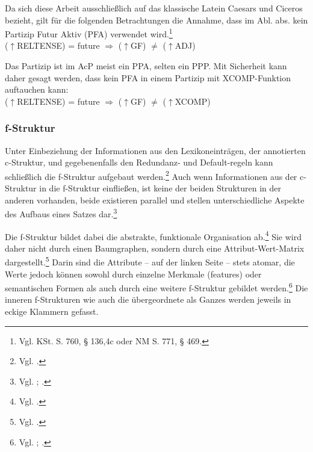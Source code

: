 \documentclass[12pt,a4paper]{article}
\begin{document}


Da sich diese Arbeit ausschließlich auf das klassische Latein Caesars und Ciceros bezieht, gilt für die folgenden Betrachtungen die Annahme, dass im Abl. abs. kein Partizip Futur Aktiv (PFA) verwendet wird.\footnote{Vgl. KSt. S. 760, § 136,4c oder NM S. 771, § 469.}\\
($\uparrow$RELTENSE) = future $\Rightarrow$ ($\uparrow$GF) $\neq$ ($\uparrow$ADJ)

Das Partizip ist im AcP meist ein PPA, selten ein PPP. Mit Sicherheit kann daher gesagt werden, dass kein PFA in einem Partizip mit XCOMP-Funktion auftauchen kann: \\
($\uparrow$RELTENSE) = future $\Rightarrow$ ($\uparrow$GF) $\neq$ ($\uparrow$XCOMP)




\subsubsection{f-Struktur}
Unter Einbeziehung der Informationen aus den Lexikoneinträgen, der annotierten c-Struktur, und gegebenenfalls den Redundanz- und Default-regeln kann schließlich die f-Struktur aufgebaut werden.\footnote{Vgl. \cite[13; 23]{Rohrer}.} Auch wenn Informationen aus der c-Struktur in die f-Struktur einfließen, ist keine der beiden Strukturen in der anderen vorhanden, beide existieren parallel und stellen unterschiedliche Aspekte des Aufbaus eines Satzes dar.\footnote{Vgl. \cite[26-7; 35]{Rohrer}; \cite[8]{Skript}.}

Die f-Struktur bildet dabei die abstrakte, funktionale Organisation ab.\footnote{Vgl. \cite[7]{Dalrymple}.} Sie wird daher nicht durch einen Baumgraphen, sondern durch eine Attribut-Wert-Matrix dargestellt.\footnote{Vgl. \cite[7]{Skript}.} Darin sind die Attribute -- auf der linken Seite -- stets atomar, die Werte jedoch können sowohl durch einzelne Merkmale (features) oder semantischen Formen als auch durch eine weitere f-Struktur gebildet werden.\footnote{ Vgl. \cite[13]{Rohrer}; \cite[8]{Skript}.} Die inneren f-Strukturen wie auch die übergeordnete als Ganzes werden jeweils in eckige Klammern gefasst.
\end{document}
